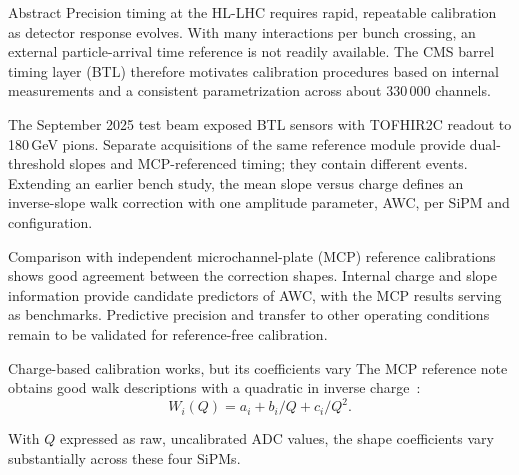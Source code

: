 

\TitleSlide

\begin{frame}{Abstract}
\fontsize{10}{12}\selectfont
Precision timing at the HL-LHC requires rapid, repeatable calibration as detector
response evolves. With many interactions per bunch crossing, an external
particle-arrival time reference is not readily available. The CMS barrel timing
layer (BTL) therefore motivates calibration procedures based on internal
measurements and a consistent parametrization across about 330\,000 channels.

The September 2025 test beam exposed BTL sensors with TOFHIR2C readout to
180\,GeV pions. Separate acquisitions of the same reference module provide
dual-threshold slopes and MCP-referenced timing; they contain different events.
Extending an earlier bench study, the mean slope versus charge defines an
inverse-slope walk correction with one amplitude parameter, AWC, per SiPM and configuration.

Comparison with independent microchannel-plate (MCP) reference calibrations shows
good agreement between the correction shapes. Internal charge and slope
information provide candidate predictors of AWC, with the MCP results serving
as benchmarks. Predictive precision and transfer to other operating conditions
remain to be validated for reference-free calibration.
\end{frame}

\begin{frame}{Charge-based calibration works, but its coefficients vary}
\normalsize
The MCP reference note obtains good walk descriptions with a quadratic in
inverse charge~\cite{ReferenceNote}:
\[
W_i(Q)=a_i+b_i/Q+c_i/Q^2.
\]
\centering
\small
\setlength{\tabcolsep}{4pt}

\par\raggedright
\normalsize
With $Q$ expressed as raw, uncalibrated ADC values, the shape coefficients
vary substantially across these four SiPMs.
\end{frame}

